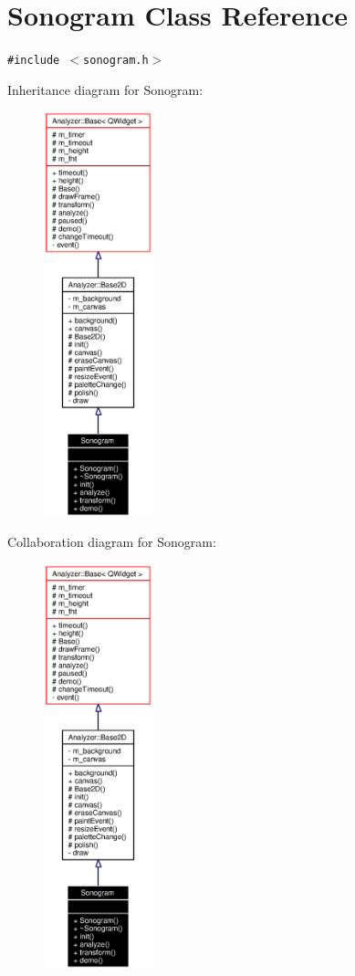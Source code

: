 \section{Sonogram Class Reference}
\label{classSonogram}
{\tt \#include $<$sonogram.h$>$}

Inheritance diagram for Sonogram:\begin{figure}[H]
\begin{center}
\leavevmode
\includegraphics[width=89pt]{classSonogram__inherit__graph}
\end{center}
\end{figure}
Collaboration diagram for Sonogram:\begin{figure}[H]
\begin{center}
\leavevmode
\includegraphics[width=89pt]{classSonogram__coll__graph}
\end{center}
\end{figure}


